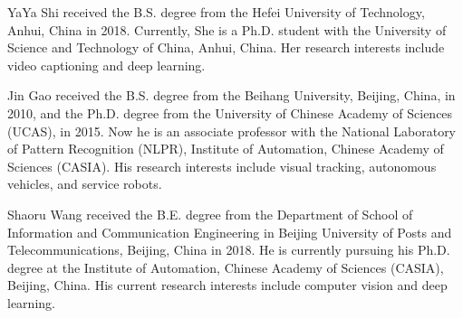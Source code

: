 \documentclass[journal]{IEEEtran}
\begin{document}
\begin{IEEEbiography}
  {YaYa Shi}
  received the B.S. degree from the Hefei University of Technology, Anhui, China in 2018. Currently, She is a Ph.D. student with the University of Science and Technology of China, Anhui, China. Her research interests include video captioning and deep learning.
\end{IEEEbiography}

\begin{IEEEbiography}
{Jin Gao}
received the B.S. degree from the Beihang University, Beijing, China, in 2010, and the Ph.D. degree from the University of Chinese Academy of Sciences (UCAS), in 2015. Now he is an associate professor with the National Laboratory of Pattern Recognition (NLPR), Institute of Automation, Chinese Academy of Sciences (CASIA). His research interests include visual tracking, autonomous vehicles, and service robots.
\end{IEEEbiography}

\begin{IEEEbiography}
{Shaoru Wang}
received the B.E. degree from the Department of School of Information and Communication Engineering in Beijing University of Posts and Telecommunications, Beijing, China in 2018. He is currently pursuing his Ph.D. degree at the Institute of Automation, Chinese Academy of Sciences (CASIA), Beijing, China. His current research interests include computer vision and deep learning.
\end{IEEEbiography}
\end{document}
